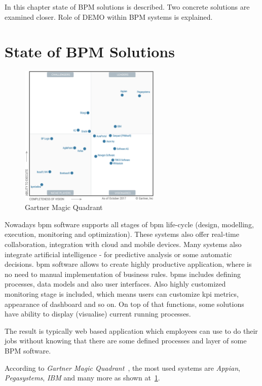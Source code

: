 In this chapter state of BPM solutions is described. Two concrete solutions are examined closer. Role of DEMO within BPM systems is explained. 
\section{State of BPM Solutions}
\begin{figure}[ht!]
	\centering
    \includegraphics[width=0.6\textwidth, keepaspectratio]{img/gartner-magic-quadrant.png}
    \caption{Gartner Magic Quadrant \cite{gartner-2017} }
    \label{fig:gartner-magic-quadrant}
\end{figure}

Nowadays \gls{bpm} software supports all stages of \gls{bpm} life-cycle (design, modelling, execution, monitoring and optimization). These systems also offer real-time collaboration, integration with cloud and mobile devices. Many systems also integrate artificial intelligence - for predictive analysis or some automatic decisions. \gls{bpm} software allows to create highly productive application, where is no need to manual implementation of business rules. \gls{bpms} includes defining processes, data models and also user interfaces. Also highly customized monitoring stage is included, which means users can customize \gls{kpi} metrics, appearance of dashboard and so on. On top of that functions, some solutions have ability to display (visualise) current running processes.  

The result is typically web based application which employees can use to do their jobs without knowing that there are some defined processes and layer of some BPM software. 

According to \textit{Gartner Magic Quadrant}~\cite{gartner-2017}, the most used systems are \textit{Appian}, \textit{Pegasystems}, \textit{IBM} and many more as shown at~\cref{fig:gartner-magic-quadrant}.
